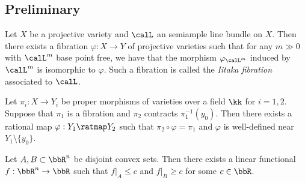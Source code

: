 \subsection{Preliminary}

    \begin{theorem}\label{thm: Iitaka fibration in semiample case}
        Let \(X\) be a projective variety and \(\calL\) an semiample line bundle on \(X\).
        Then there exists a fibration \(\varphi: X \to Y\) of projective varieties
        such that for any \(m\gg 0\) with \(\calL^m\) base point free, we have that the morphism \(\varphi_{\calL^m}\) induced by \(\calL^m\) is isomorphic to \(\varphi\).
        Such a fibration is called the \emph{Iitaka fibration} associated to \(\calL\).
    \end{theorem}

    \begin{theorem}\label{thm: Rigidity Lemma}
        Let \(\pi_i: X \to Y_i\) be proper morphisms of varieties over a field \(\kk\) for \(i=1,2\).
        Suppose that \(\pi_1\) is a fibration and \(\pi_2\) contracts \(\pi_1^{-1}(y_0)\).
        Then there exists a rational map \(\varphi: Y_1 \ratmap Y_2\) such that \(\pi_2 \circ \varphi = \pi_1\) and \(\varphi\) is well-defined near \(Y_1 \setminus \{y_0\}\).
    \end{theorem}

    \begin{theorem}\label{thm:convex_separation_theorem}
        Let \(A,B \subset \bbR^n\) be disjoint convex sets.
        Then there exists a linear functional \(f: \bbR^n \to \bbR\) such that \(f|_A \leq c\) and \(f|_B \geq c\) for some \(c \in \bbR\).
    \end{theorem}



